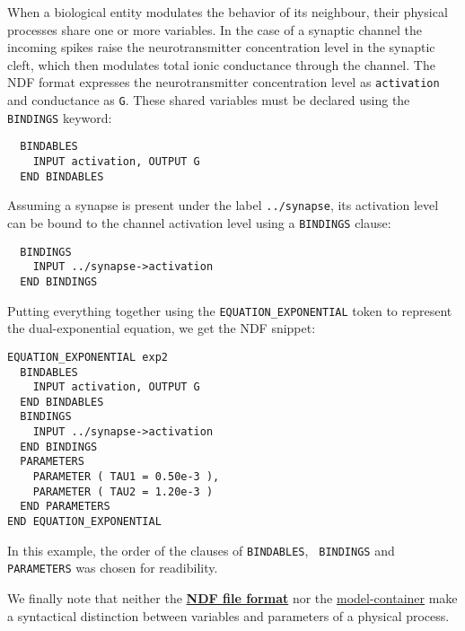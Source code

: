 \documentclass[12pt]{article}
\begin{document}
When a biological entity modulates the behavior of its neighbour,
their physical processes share one or more variables.  In the case of
a synaptic channel the incoming spikes raise the neurotransmitter
concentration level in the synaptic cleft, which then modulates total
ionic conductance through the channel.  The NDF format expresses the
neurotransmitter concentration level as {\tt activation} and
conductance as {\tt G}.  These shared variables must be declared using
the {\tt BINDINGS} keyword:
\begin{verbatim}
  BINDABLES
    INPUT activation, OUTPUT G
  END BINDABLES
\end{verbatim}
Assuming a synapse is present under the label {\tt ../synapse}, its
activation level can be bound to the channel activation level using a
{\tt BINDINGS} clause:
\begin{verbatim}
  BINDINGS
    INPUT ../synapse->activation
  END BINDINGS
\end{verbatim}

Putting everything together using the {\tt EQUATION\_EXPONENTIAL}
token to represent the dual-exponential equation, we get the NDF
snippet:
\begin{verbatim}
EQUATION_EXPONENTIAL exp2
  BINDABLES
    INPUT activation, OUTPUT G
  END BINDABLES
  BINDINGS
    INPUT ../synapse->activation
  END BINDINGS
  PARAMETERS
    PARAMETER ( TAU1 = 0.50e-3 ),
    PARAMETER ( TAU2 = 1.20e-3 )
  END PARAMETERS
END EQUATION_EXPONENTIAL
\end{verbatim}

In this example, the order of the clauses of {\tt BINDABLES}, {\tt
  BINDINGS} and {\tt PARAMETERS} was chosen for readibility.

We finally note that neither the
\href{../ndf-file-format/ndf-file-format.tex}{\bf NDF file format} nor
the \href{../model-container/model-container.tex}{model-container}
make a syntactical distinction between variables and parameters of a
physical process.
\end{document}
